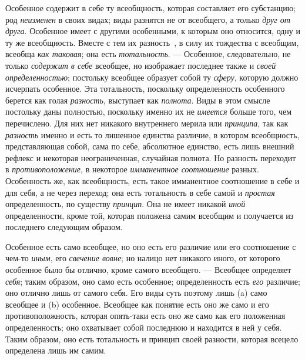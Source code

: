 \documentclass[twoside]{article}
\begin{document}
{{Особенное содержит в себе ту всеобщность, которая составляет
его субстанцию; род {\em неизменен}
в своих видах; виды разнятся не от всеобщего, а только
{\em друг от друга}.
Особенное имеет с другими особенными, к которым оно
относится, одну и ту же всеобщность. Вместе с тем их
разность~\label{bkm:bm16},
в силу их тождества с всеобщим, всеобща
{\em как таковая}; она
есть {\em тотальность}. —
Особенное, следовательно, не только
{\em содержит в себе}
всеобщее, но изображает последнее также и
{\em своей определенностью};
постольку всеобщее образует собой ту
{\em сферу}, которую
должно исчерпать особенное. Эта тотальность, поскольку определенность
особенного берется как голая
{\em разность}, выступает
как {\em полнота}. Виды в
этом смысле постольку даны полностью, поскольку именно их не
{\em имеется} больше
того, чем перечислено. Для них нет никакого внутреннего мерила или
{\em принципа}, так как
{\em разность} именно и
есть то лишенное единства различие, в котором всеобщность, представляющая
собой, сама по себе, абсолютное единство, есть лишь внешний рефлекс и
некоторая неограниченная, случайная полнота. Но разность переходит в
{\em противоположение}, в
некоторое {\em имманентное соотношение}
разных. Особенность же, как всеобщность, есть такое
имманентное соотношение в себе и для себя, а не через переход; она есть
тотальность в себе самой и
{\em простая}
определенность, по существу
{\em принцип}. Она не
имеет никакой {\em иной}
определенности, кроме той, которая положена самим всеобщим и
получается из последнего следующим образом.

Особенное есть само всеобщее, но оно есть его различие или его
соотношение с чем-то {\em иным},
его {\em свечение
вовне}; но налицо нет никакого иного, от которого
особенное было бы отлично, кроме самого всеобщего. —
Всеобщее определяет
{\em себя}; таким
образом, оно само есть особенное; определенность есть
{\em его} различие; оно
отлично лишь от самого себя. Его виды суть поэтому лишь (a)
само всеобщее и (b) особенное. Всеобщее как понятие есть оно
же само и его противоположность, которая опять-таки есть оно же само как
его положенная определенность; оно охватывает собой последнюю и находится в
ней у себя. Таким образом, оно есть тотальность и принцип своей разности,
которая всецело определена лишь им самим.

}}
\end{document}
